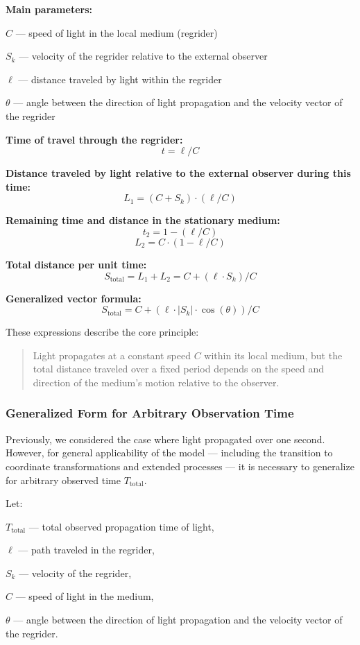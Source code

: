 \documentclass[12pt]{article}
\begin{document}
\textbf{Main parameters:}
\par
$C$ — speed of light in the local medium (regrider)
\par
$S_k$ — velocity of the regrider relative to the external observer
\par
$\ell$ — distance traveled by light within the regrider
\par
$\theta$ — angle between the direction of light propagation and the velocity vector of the regrider

\textbf{Time of travel through the regrider:}
\[
t = \ell / C
\]

\textbf{Distance traveled by light relative to the external observer during this time:}
\[
L_1 = (C + S_k) \cdot (\ell / C)
\]

\textbf{Remaining time and distance in the stationary medium:}
\[
t_2 = 1 - (\ell / C)
\]
\[
L_2 = C \cdot (1 - \ell / C)
\]

\textbf{Total distance per unit time:}
\[
S_{\text{total}} = L_1 + L_2 = C + (\ell \cdot S_k) / C
\]

\textbf{Generalized vector formula:}
\[
S_{\text{total}} = C + (\ell \cdot \left|S_k\right| \cdot \cos(\theta)) / C
\]

These expressions describe the core principle:
\begin{quote}
Light propagates at a constant speed $C$ within its local medium, but the total distance traveled over a fixed period depends on the speed and direction of the medium’s motion relative to the observer.
\end{quote}

\subsubsection*{Generalized Form for Arbitrary Observation Time}
Previously, we considered the case where light propagated over one second. However, for general applicability of the model — including the transition to coordinate transformations and extended processes — it is necessary to generalize for arbitrary observed time $T_{\text{total}}$.

Let:
\par
$T_{\text{total}}$ — total observed propagation time of light,
\par
$\ell$ — path traveled in the regrider,
\par
$S_k$ — velocity of the regrider,
\par
$C$ — speed of light in the medium,
\par
$\theta$ — angle between the direction of light propagation and the velocity vector of the regrider.
\end{document}
